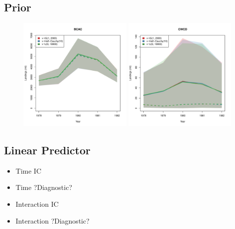 \documentclass[12pt]{article}
\begin{document}
%
\subsection{Prior}
%

%
\begin{figure}[h!]
\centering
\includegraphics[width=0.49\textwidth]{./quickScripts/M4IGHC1U4/BCAC/yearBCAC.pdf}
\includegraphics[width=0.49\textwidth]{./quickScripts/M4IGHC1U4/CWCD/yearCWCD.pdf}
\end{figure}

%
\subsection{Linear Predictor}
%

%
\begin{itemize}
	\item Time IC
	\item Time ?Diagnostic?
	\item Interaction IC
	\item Interaction ?Diagnostic?
\end{itemize}
\end{document}
